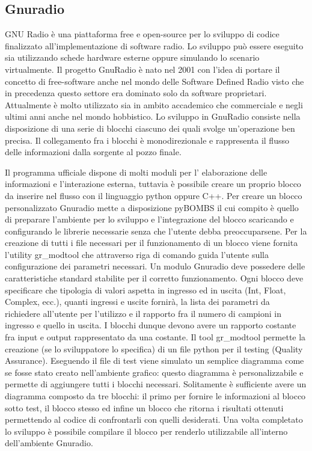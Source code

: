 \begin{itemize}
\chapter{Gnuradio}
GNU Radio è una piattaforma free e open-source per lo sviluppo di codice finalizzato all'implementazione di software radio. Lo sviluppo può essere eseguito sia utilizzando schede hardware esterne oppure simulando lo scenario virtualmente. Il progetto GnuRadio è nato nel 2001 con l'idea di portare il concetto di free-software anche nel mondo delle Software Defined Radio visto che in precedenza questo settore era dominato solo da software proprietari. Attualmente è molto utilizzato sia in ambito accademico che commerciale e negli ultimi anni anche nel mondo hobbistico. Lo sviluppo in GnuRadio consiste nella disposizione di una serie di blocchi ciascuno dei quali svolge un'operazione ben precisa. Il collegamento fra i blocchi è monodirezionale e rappresenta il flusso delle informazioni dalla sorgente al pozzo finale.

 Il programma ufficiale dispone di molti moduli per l' elaborazione delle informazioni e l'interazione esterna, tuttavia è possibile creare un proprio blocco da inserire nel flusso con il linguaggio python oppure C++. Per creare un blocco personalizzato Gnuradio mette a disposizione pyBOMBS il cui compito è quello di preparare l'ambiente per lo sviluppo e l'integrazione del blocco scaricando e configurando le librerie necessarie senza che l'utente debba preoccuparsene.
 Per la creazione di tutti i file necessari per il funzionamento di un blocco viene fornita l'utility gr\_modtool che attraverso riga di comando guida l'utente sulla configurazione dei parametri necessari. Un modulo Gnuradio deve possedere delle caratteristiche standard stabilite per il corretto funzionamento. Ogni blocco deve specificare che tipologia di valori aspetta in ingresso ed in uscita (Int, Float, Complex, ecc.), quanti ingressi e uscite fornirà, la lista dei parametri da richiedere all'utente per l'utilizzo e il rapporto fra il numero di campioni in ingresso e quello in uscita. I blocchi dunque devono avere un rapporto costante fra input e output rappresentato da una costante. Il tool gr\_modtool permette la creazione (se lo sviluppatore lo specifica) di un file python per il testing (Quality Assurance). Eseguendo il file di test viene simulato un semplice diagramma come se fosse stato creato nell'ambiente grafico: questo diagramma è personalizzabile e permette di aggiungere tutti i blocchi necessari. Solitamente è sufficiente avere un diagramma composto da tre blocchi: il primo per fornire le informazioni al blocco sotto test, il blocco stesso ed infine un blocco che ritorna i risultati ottenuti permettendo al codice di confrontarli con quelli desiderati.
 Una volta completato lo sviluppo è possibile compilare il blocco per renderlo utilizzabile all'interno dell'ambiente Gnuradio.


\end{itemize}
